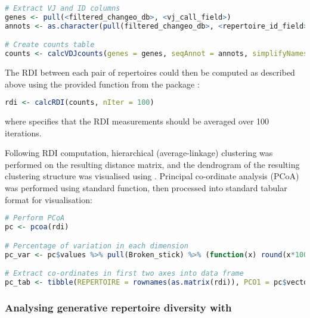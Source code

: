 \begin{lstlisting}[language=R]
# Extract VJ and ID columns
genes <- pull(<filtered_changeo_db>, <vj_call_field>)
annots <- as.character(pull(filtered_changeo_db>, <repertoire_id_field>))

# Create counts table
counts <- calcVDJcounts(genes = genes, seqAnnot = annots, simplifyNames = TRUE, splitCommas = FALSE)
\end{lstlisting}

\noindent The RDI between each pair of repertoires could then be computed as described above using the provided  function from the  package \parencite{bolen2017rdi}:

\begin{lstlisting}[language=R]
rdi <- calcRDI(counts, nIter = 100)
\end{lstlisting}

\noindent where  specifies that the RDI measurements should be averaged over 100 iterations.

Following RDI computation, hierarchical (average-linkage) clustering was performed on the resulting distance matrix, and the dendrogram of the resulting clustering structure was visualised using . Principal co-ordinate analysis (PCoA) was performed using standard   function, then processed into standard tabular format for visualisation:

\begin{lstlisting}[language=R]
# Perform PCoA
pc <- pcoa(rdi)

# Percentage of variation in each dimension
pc_var <- pc$values %>% pull(Broken_stick) %>% (function(x) round(x*100, 1))

# Extract co-ordinates in first two axes into data frame
pc_tab <- tibble(REPERTOIRE = rownames(as.matrix(rdi)), PCO1 = pc$vectors[,1], PCO2 = pc$vectors[,2])
\end{lstlisting}

\subsubsection{Analysing generative repertoire diversity with }
\label{sec:methods_comp_igdownstream_igor}

